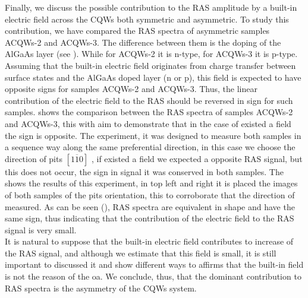 Finally, we discuss the possible contribution to the RAS amplitude by a built-in electric field across the CQWs both symmetric and asymmetric. To study this contribution, we have compared the RAS spectra of asymmetric samples \gls{ACQWs}-2 and \gls{ACQWs}-3. The difference between them is the doping of the AlGaAs layer (see ). While for \gls{ACQWs}-2 it is n-type, for \gls{ACQWs}-3 it is p-type. Assuming that the built-in electric field  originates from charge transfer between surface states and  the AlGaAs doped layer (n or p), this field is expected to have opposite signs for samples \gls{ACQWs}-2 and \gls{ACQWs}-3. Thus, the linear contribution of the electric field to the \gls{RAS} should be reversed in sign for such samples.  shows the comparison between the \gls{RAS} spectra of samples \gls{ACQWs}-2 and \gls{ACQWs}-3,  this with aim to demonstrate that  in the case of existed a field the sign is opposite.    The experiment, it was designed to measure both samples in a sequence way along the same preferential direction, in this case we choose the direction of pits $\left[1\overline{1}0\right]$ \cite{weyher2010defect}, if existed a field we expected a opposite RAS signal, but this does not occur, the sign in signal it was conserved in both samples. The  shows the results of this experiment, in top left and right it is placed the images of both samples of the pits orientation, this to corroborate that the direction of measured. 
As can be seen (), RAS spectra are equivalent in shape and have the same sign, thus indicating that the contribution of the electric field to the \gls{RAS} signal is very small. \\
It is natural to suppose that the built-in electric field contributes to increase of the \gls{RAS} signal, and although  we estimate that this field is small, it is still important to discussed it and show different ways to affirms that  the built-in field is not the reason of the \gls{oa}. 
We conclude, thus, that the dominant contribution to \gls{RAS} spectra is the asymmetry of the \gls{CQWs} system. 

